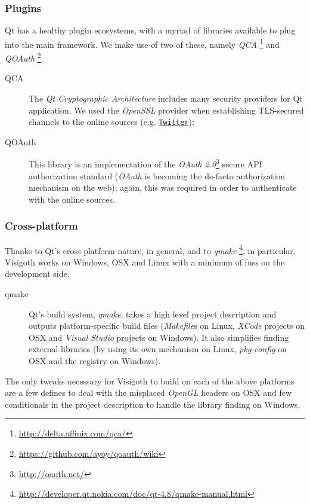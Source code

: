 \documentclass[a4paper,11pt,titlepage]{article}
\let\stdhref\href
\renewcommand{\href}[2]{\stdhref{#1}{\texttt{#2}}}
\newcommand{\buzz}[1]{\emph{#1}}
\begin{document}
\subsubsection{Plugins}

Qt has a healthy plugin ecosystems, with a myriad of libraries
available to plug into the main framework. We make use of two of
these, namely
\buzz{QCA} \footnote{\url{http://delta.affinix.com/qca/}} and
\buzz{QOAuth} \footnote{\url{https://github.com/ayoy/qoauth/wiki}}.

\begin{description}
\item [QCA] The \buzz{Qt Cryptographic Architecture} includes many
  security providers for Qt application. We used the \buzz{OpenSSL}
  provider when establishing TLS-secured channels to the online
  sources (e.g. \href{http://twitter.com}{Twitter});
\item [QOAuth] This library is an implementation of the \buzz{OAuth
  2.0}\footnote{\url{http://oauth.net/}} secure API authorization
  standard (\buzz{OAuth} is becoming the de-facto authorization
  mechanism on the web); again, this was required in order to
  authenticate with the online sources.
\end{description}

\subsubsection{Cross-platform}

Thanks to Qt's cross-platform nature, in general, and to
\buzz{qmake} \footnote{\url{http://developer.qt.nokia.com/doc/qt-4.8/qmake-manual.html}},
in particular, Visigoth works on Windows, OSX and Linux with a minimum
of fuss on the development side.

\begin{description}
\item [qmake] Qt's build system, \buzz{qmake}, takes a high level
  project description and outputs platform-specific build files
  (\buzz{Makefile}s on Linux, \buzz{XCode} projects on OSX and
  \buzz{Visual Studio} projects on Windows). It also simplifies
  finding external libraries (by using its own mechanism on Linux,
  \buzz{pkg-config} on OSX and the registry on Windows).
\end{description}

The only tweaks necessary for Visigoth to build on each of the above
platforms are a few defines to deal with the misplaced \buzz{OpenGL}
headers on OSX and few conditionals in the project description to
handle the library finding on Windows.
\end{document}
